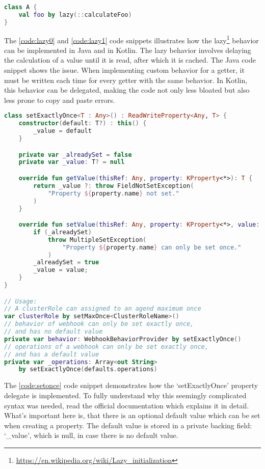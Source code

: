 \begin{lstlisting}[caption={Lazy property in Kotlin},language=Kotlin,label=code:lazy1]
class A {
    val foo by lazy(::calculateFoo)
}
\end{lstlisting}

The \ref{code:lazy0} and \ref{code:lazy1} code snippets illustrates how the lazy\footnote{\url{https://en.wikipedia.org/wiki/Lazy_initialization}} behavior can be implemented in Java and in Kotlin. The lazy behavior involves delaying the calculation of a value until it is read, after which it is cached. The Java code snippet shows the issue. When implementing custom behavior for a getter, it must be written each time for every getter with the same behavior. In Kotlin, this behavior can be delegated, making the code not only less bloated but also less prone to copy and paste errors.

\begin{minipage}{\linewidth}
\begin{lstlisting}[caption={setExactlyOnce implementation},language=Kotlin,label=code:setonce]
class setExactlyOnce<T : Any>() : ReadWriteProperty<Any, T> {
    constructor(default: T?) : this() {
        _value = default
    }

    private var _alreadySet = false
    private var _value: T? = null

    override fun getValue(thisRef: Any, property: KProperty<*>): T {
        return _value ?: throw FieldNotSetException(
            "Property ${property.name} not set."
        )
    }

    override fun setValue(thisRef: Any, property: KProperty<*>, value: T) {
        if (_alreadySet)
            throw MultipleSetException(
                "Property ${property.name} can only be set once."
            )
        _alreadySet = true
        _value = value;
    }
}

// Usage:
// A clusterRole can assigned to an agend maximum once
var clusterRole by setMaxOnce<ClusterRoleName>()
// behavior of webhook can only be set exactly once,
// and has no default value
private var behavior: WebhookBehaviorProvider by setExactlyOnce()
// operations of a webhook can only be set exactly once,
// and has a default value
private var _operations: Array<out String>
    by setExactlyOnce(defaults.operations)
\end{lstlisting}
\end{minipage}

The \ref{code:setonce} code snippet demonstrates how the `setExactlyOnce' property delegate is implemented. To fully understand why this seemingly complicated syntax was needed, read the official documentation which explains it in detail. What's important here is, that there is an optional default value which can be set when creating a property. The default value is stored in a private backing field: `\_value', which is null, in case there is no default value. 

